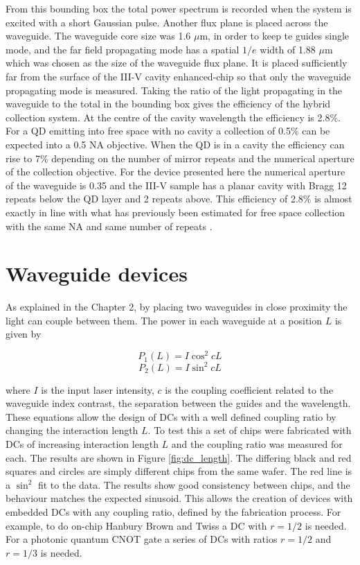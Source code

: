 From this bounding box the total power spectrum is recorded when the system is
excited with a short Gaussian pulse. Another flux plane is placed across the
waveguide. The waveguide core size was 1.6 $\mu \mathrm{m}$, in order to keep te
guides single mode, and the far field propagating mode has a spatial $1/e$ width
of 1.88 $\mu \mathrm{m}$ which was chosen as the size of the waveguide flux
plane. It is placed sufficiently far from the surface of the III-V cavity
enhanced-chip so that only the waveguide propagating mode is measured. Taking
the ratio of the light propagating in the waveguide to the total in the bounding
box gives the efficiency of the hybrid collection system. At the centre of the
cavity wavelength the efficiency is 2.8\%. For a QD emitting into free space
with no cavity a collection of 0.5\% can be expected into a 0.5 NA objective.
When the QD is in a cavity the efficiency can rise to 7\% depending on the
number of mirror repeats and the numerical aperture of the collection objective.
For the device presented here the numerical aperture of the waveguide is 0.35
and the III-V sample has a planar cavity with Bragg 12 repeats below the QD
layer and 2 repeats above. This efficiency of 2.8\% is almost exactly in line
with what has previously been estimated for free space collection with the same
NA and same number of repeats \cite{bennett2006single}.

\section{Waveguide devices}

\label{sec:wg_devices} As explained in the Chapter 2, by placing two waveguides
in close proximity the light can couple between them. The power in each
waveguide at a position $L$ is given by

\begin{equation} P_1(L) = I \cos^2 cL \end{equation} \begin{equation} P_2(L) = I
\sin^2 cL \end{equation}

where $I$ is the input laser intensity, $c$ is the coupling coefficient related
to the waveguide index contrast, the separation between the guides and the
wavelength. These equations allow the design of DCs with a well defined coupling
ratio by changing the interaction length $L$. To test this a set of chips were
fabricated with DCs of increasing interaction length $L$ and the coupling ratio
was measured for each. The results are shown in Figure \ref{fig:dc_length}. The
differing black and red squares and circles are simply different chips from the
same wafer. The red line is a $\sin^2$ fit to the data. The results show good
consistency between chips, and the behaviour matches the expected sinusoid. This
allows the creation of devices with embedded DCs with any coupling ratio,
defined by the fabrication process. For example, to do on-chip Hanbury Brown and
Twiss a DC with $r = 1/2$ is needed. For a photonic quantum CNOT gate a series
of DCs with ratios $r = 1/2$ and $r = 1/3$ is needed.

